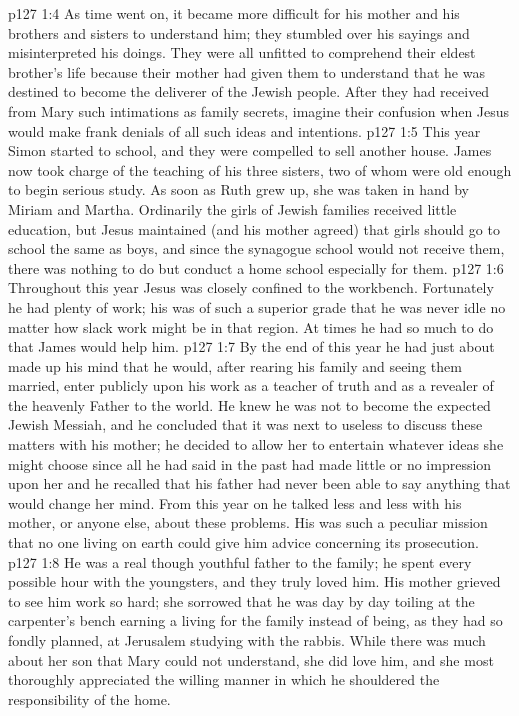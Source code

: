 \pc \vs p127 1:4 As time went on, it became more difficult for his mother and his brothers and sisters to understand him; they stumbled over his sayings and misinterpreted his doings. They were all unfitted to comprehend their eldest brother’s life because their mother had given them to understand that he was destined to become the deliverer of the Jewish people. After they had received from Mary such intimations as family secrets, imagine their confusion when Jesus would make frank denials of all such ideas and intentions.
\pc \vs p127 1:5 This year Simon started to school, and they were compelled to sell another house. James now took charge of the teaching of his three sisters, two of whom were old enough to begin serious study. As soon as Ruth grew up, she was taken in hand by Miriam and Martha. Ordinarily the girls of Jewish families received little education, but Jesus maintained (and his mother agreed) that girls should go to school the same as boys, and since the synagogue school would not receive them, there was nothing to do but conduct a home school especially for them.
\vs p127 1:6 Throughout this year Jesus was closely confined to the workbench. Fortunately he had plenty of work; his was of such a superior grade that he was never idle no matter how slack work might be in that region. At times he had so much to do that James would help him.
\vs p127 1:7 By the end of this year he had just about made up his mind that he would, after rearing his family and seeing them married, enter publicly upon his work as a teacher of truth and as a revealer of the heavenly Father to the world. He knew he was not to become the expected Jewish Messiah, and he concluded that it was next to useless to discuss these matters with his mother; he decided to allow her to entertain whatever ideas she might choose since all he had said in the past had made little or no impression upon her and he recalled that his father had never been able to say anything that would change her mind. From this year on he talked less and less with his mother, or anyone else, about these problems. His was such a peculiar mission that no one living on earth could give him advice concerning its prosecution.
\vs p127 1:8 He was a real though youthful father to the family; he spent every possible hour with the youngsters, and they truly loved him. His mother grieved to see him work so hard; she sorrowed that he was day by day toiling at the carpenter’s bench earning a living for the family instead of being, as they had so fondly planned, at Jerusalem studying with the rabbis. While there was much about her son that Mary could not understand, she did love him, and she most thoroughly appreciated the willing manner in which he shouldered the responsibility of the home.
